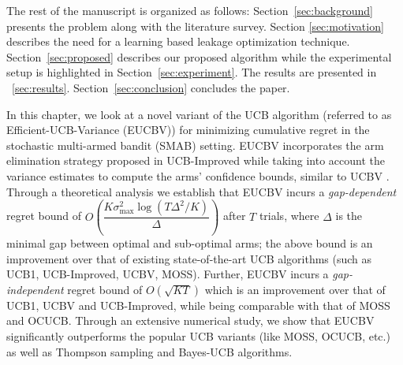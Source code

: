 
 
The rest of the manuscript is organized as follows: Section~\ref{sec:background}  presents the problem along with the literature survey. Section \ref{sec:motivation} describes the need for a learning based leakage optimization technique. Section~\ref{sec:proposed} describes our proposed algorithm while the experimental setup is highlighted in Section~\ref{sec:experiment}. The results are presented in ~\ref{sec:results}. Section~\ref{sec:conclusion} concludes the paper.
% 
% 


In this chapter, we look at a novel variant of the UCB algorithm (referred to as Efficient-UCB-Variance (EUCBV)) for minimizing cumulative regret in the stochastic multi-armed bandit (SMAB) setting. EUCBV incorporates the arm elimination strategy proposed in UCB-Improved \citep{auer2010ucb} while taking into account the variance estimates to compute the arms' confidence bounds, similar to UCBV \citep{audibert2009exploration}. Through a theoretical analysis we establish that EUCBV incurs a \emph{gap-dependent} regret bound of {$O\left( \dfrac{K\sigma^2_{\max} \log (T\Delta^2 /K)}{\Delta}\right)$} after $T$ trials, where $\Delta$ is the minimal gap between optimal and sub-optimal arms; the above bound is an improvement over that of existing state-of-the-art UCB algorithms (such as UCB1, UCB-Improved, UCBV,  MOSS). Further, EUCBV incurs a \emph{gap-independent} regret bound of {$O\left(\sqrt{KT}\right)$}  which is an improvement over that of UCB1, UCBV and UCB-Improved, while being comparable with that of MOSS and OCUCB. Through an extensive numerical study, we show that EUCBV significantly outperforms the popular UCB variants (like MOSS, OCUCB, etc.) as well as Thompson sampling and Bayes-UCB algorithms. 

